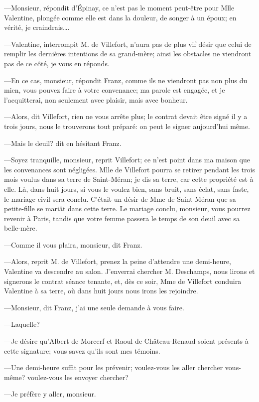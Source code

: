 —Monsieur, répondit d'Épinay, ce n'est pas le moment peut-être pour Mlle Valentine, plongée comme elle est dans la douleur, de songer à un époux; en vérité, je craindrais\dots. 

—Valentine, interrompit M. de Villefort, n'aura pas de plus vif désir que celui de remplir les dernières intentions de sa grand-mère; ainsi les obstacles ne viendront pas de ce côté, je vous en réponds.  

—En ce cas, monsieur, répondit Franz, comme ils ne viendront pas non plus du mien, vous pouvez faire à votre convenance; ma parole est engagée, et je l'acquitterai, non seulement avec plaisir, mais avec bonheur. 

—Alors, dit Villefort, rien ne vous arrête plus; le contrat devait être signé il y a trois jours, nous le trouverons tout préparé: on peut le signer aujourd'hui même. 

—Mais le deuil? dit en hésitant Franz. 

—Soyez tranquille, monsieur, reprit Villefort; ce n'est point dans ma maison que les convenances sont négligées. Mlle de Villefort pourra se retirer pendant les trois mois voulus dans sa terre de Saint-Méran; je dis sa terre, car cette propriété est à elle. Là, dans huit jours, si vous le voulez bien, sans bruit, sans éclat, sans faste, le mariage civil sera conclu. C'était un désir de Mme de Saint-Méran que sa petite-fille se mariât dans cette terre. Le mariage conclu, monsieur, vous pourrez revenir à Paris, tandis que votre femme passera le temps de son deuil avec sa belle-mère. 

—Comme il vous plaira, monsieur, dit Franz. 

—Alors, reprit M. de Villefort, prenez la peine d'attendre une demi-heure, Valentine va descendre au salon. J'enverrai chercher M. Deschamps, nous lirons et signerons le contrat séance tenante, et, dès ce soir, Mme de Villefort conduira Valentine à sa terre, où dans huit jours nous irons les rejoindre. 

—Monsieur, dit Franz, j'ai une seule demande à vous faire.  

—Laquelle? 

—Je désire qu'Albert de Morcerf et Raoul de Château-Renaud soient présents à cette signature; vous savez qu'ils sont mes témoins. 

—Une demi-heure suffit pour les prévenir; voulez-vous les aller chercher vous-même? voulez-vous les envoyer chercher? 

—Je préfère y aller, monsieur. 

